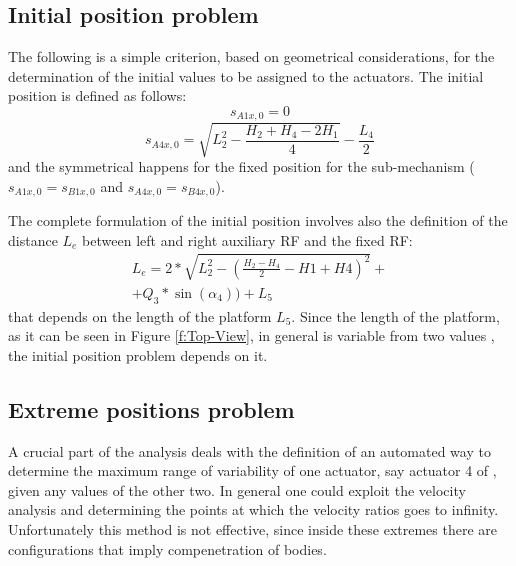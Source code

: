 \documentclass[10.5pt, twocolumn]{article}
\newcommand*\circled[1]{\tikz[baseline=(char.base)]{
  \node[shape=circle,draw,inner sep=2pt] (char) {#1};}}
\begin{document}
\subsection{Initial position problem}
\label{s:Initial-position}
The following is a simple criterion, based on geometrical considerations, for the determination of the initial values to be assigned to the actuators. The initial position is defined as follows:
\begin{equation}
  s_{A1x,0} = 0
\end{equation}
\begin{equation}
  s_{A4x,0} = \sqrt{L_2^2-\frac{H_2+H_4-2H_1}{4}} - \frac{L_4}{2}
\end{equation}
and the symmetrical happens for the fixed position for the sub-mechanism \circled{B} (\( s_{A1x,0} = s_{B1x,0} \) and \( s_{A4x,0} = s_{B4x,0} \)).

The complete formulation of the initial position involves also the definition of the distance \( L_e \) between left and right auxiliary RF and the fixed RF:
\begin{multline}
  L_e = 2*\sqrt{L_2^2-(\frac{H_2-H_4}{2}-H1+H4)^2}+\\
  + Q_3*\sin(\alpha_4)) + L_5
\end{multline}
that depends on the length of the platform \( L_5 \). Since the length of the platform, as it can be seen in Figure \ref{f:Top-View}, in general is variable from two values \cite{aVDS}, the initial position problem depends on it.

\subsection{Extreme positions problem}
\label{s:Extreme-positions}
A crucial part of the analysis deals with the definition of an automated way to determine the maximum range of variability of one actuator, say actuator 4 of \circled{B}, given any values of the other two. In general one could exploit the velocity analysis and determining the points at which the velocity ratios goes to infinity. Unfortunately this method is not effective, since inside these extremes there are configurations that imply compenetration of bodies.
\end{document}
